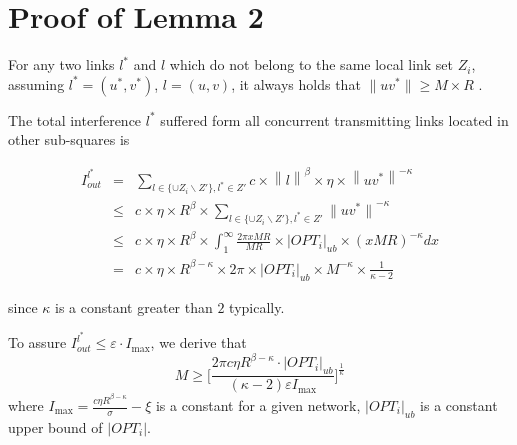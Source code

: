 \documentclass[journal]{IEEEtran}
\begin{document}
\section{Proof of Lemma 2}
\begin{IEEEproof}
For any two links $l^*$ and $ l$ which do not belong to the same local link set $Z_i$, assuming $l^*=(u^*, v^*)$,
$l=(u,v)$, it always holds that
$    \|uv^*\| \ge M \times R \mbox{~.}$

The total interference $l^*$ suffered form all concurrent transmitting links located in other sub-squares is


\begin{eqnarray*}
    I_{out}^ {l^\ast } &=& \sum\limits_{l\in \{\cup Z_i \backslash Z'\},l^\ast \in Z'}
                            c \times {\left\| l \right\|}^\beta \times \eta \times \left\| {uv^\ast }\right\|^{-\kappa } \\
    & \le & c \times \eta \times R^{\beta} \times \sum\limits_{l\in \{\cup Z_i \backslash Z'\},l^\ast \in Z'}{\|uv^*\|}^{-\kappa} \\
    & \le & c \times \eta \times R^{\beta} \times \int_1^{\infty}{ \frac{2 \pi x M R}{M R} \times |OPT_{i}|_{ub} \times
            (x M R)^{-\kappa} dx}  \\
    & =   & c \times \eta \times R^{\beta-\kappa} \times 2\pi \times |OPT_{i}|_{ub} \times M^{-\kappa} \times \frac{1}{\kappa-2}
\end{eqnarray*}

since $\kappa$ is a constant greater than $2$ typically.

To assure {\small{$I_{out} ^ {l^\ast } \le \varepsilon \cdot I_{\max}$}}, we derive that
\[
    M \ge \biggl[ \frac{2 \pi c \eta R^{\beta-\kappa} \cdot |OPT_{i}|_{ub}}{(\kappa-2) \varepsilon  I_{\max}} \biggr]^{\frac{1}{\kappa}}
\]
where {\small{$I_{\max} = \frac{c \eta R^{\beta-\kappa}}{\sigma} - \xi$ }} is a constant for a given network, $|OPT_{i}|_{ub}$ is a constant upper bound of $|OPT_{i}|$.
\end{IEEEproof}
\end{document}
